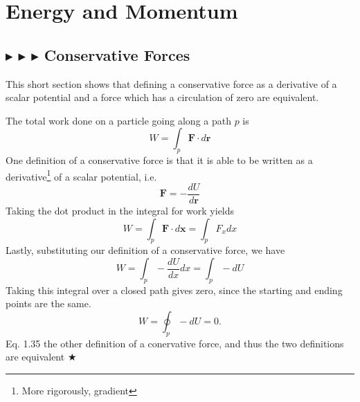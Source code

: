 \clearpage

%
%
%
%

\section{Energy and Momentum}\label{1.3}

%
%
\subsection{\color{PineGreen} $\blacktriangleright$ \color{Goldenrod} $\blacktriangleright$ \color{Orchid} $\blacktriangleright$ \color{black} Conservative Forces} \label{1.3.1}
This short section shows that defining a conservative force as a derivative of a scalar potential and a force which has a circulation of zero are equivalent. 

\noindent The total work done on a particle going along a path $p$ is 
\begin{equation}
    W = \int_p \mathbf{F}\cdot d\mathbf{r}
\end{equation}
\noindent One definition of a conservative force is that it is able to be written as a derivative\footnote{More rigorously, gradient} of a scalar potential, i.e.
\begin{equation}
    \mathbf{F} = -\frac{dU}{d\mathbf{r}}
\end{equation}
\noindent Taking the dot product in the integral for work yields
\begin{equation}
    W = \int_p \mathbf{F}\cdot d\mathbf{x} = \int_p F_xdx
\end{equation}
Lastly, substituting our definition of a conservative force, we have 
\begin{equation}
    W = \int_p - \frac{dU}{dx}dx = \int_p -dU
\end{equation}
\noindent Taking this integral over a closed path gives zero, since the starting and ending points are the same.
\begin{equation}
    W=\oint_p -dU = 0.
\end{equation}
Eq. 1.35 the other definition of a conervative force, and thus the two definitions are equivalent $\bigstar$



